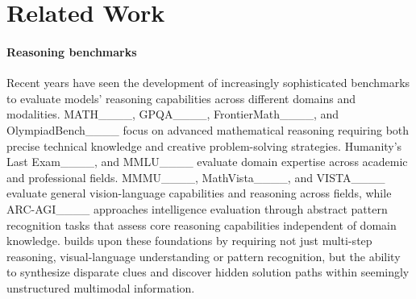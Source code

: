 \section{Related Work}
\paragraph{Reasoning benchmarks} 
Recent years have seen the development of increasingly sophisticated benchmarks to evaluate models' reasoning capabilities across different domains and modalities. 
MATH____, GPQA____, FrontierMath____, and OlympiadBench____ focus on advanced mathematical reasoning requiring both precise technical knowledge and creative problem-solving strategies. 
Humanity's Last Exam____, and MMLU____ evaluate domain expertise across academic and professional fields. 
MMMU____, MathVista____, and VISTA____ evaluate general vision-language capabilities and reasoning across fields, while ARC-AGI____ approaches intelligence evaluation through abstract pattern recognition tasks that assess core reasoning capabilities independent of domain knowledge. 
\enigmaeval builds upon these foundations by requiring not just multi-step reasoning, visual-language understanding or pattern recognition, but the ability to synthesize disparate clues and discover hidden solution paths within seemingly unstructured multimodal information.



